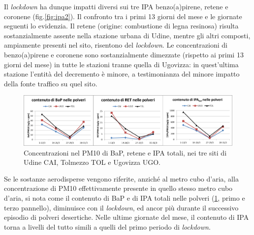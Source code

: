 Il \textit{lockdown} ha dunque impatti diversi sui tre IPA benzo(a)pirene, retene e coronene (fig.\ref{fig:ipa2}). Il confronto tra i primi 13 giorni del mese e le giornate seguenti lo evidenzia. Il retene (origine: combustione di legna resinosa) risulta sostanzialmente assente nella stazione urbana di Udine, mentre gli altri composti, ampiamente presenti nel sito, risentono del \textit{lockdown}. Le concentrazioni di benzo(a)pirene e coronene sono sostanzialmente dimezzate (rispetto ai primi 13 giorni del mese) in tutte le stazioni tranne quella di Ugovizza: in quest’ultima stazione l’entità del decremento è minore, a testimonianza del minore impatto della fonte traffico su quel sito.

\begin{figure}
    \centering
    \includegraphics[width=\textwidth]{figs/ipa-linee.png}
    \caption[Concentrazioni nel PM10 di BaP, retene e IPA totali]{Concentrazioni nel PM10 di BaP, retene e IPA totali, nei tre siti di Udine CAI, Tolmezzo TOL e Ugovizza UGO.}
    \label{fig:ipa3}
\end{figure}

Se le sostanze aerodisperse vengono riferite, anziché al metro cubo d’aria, alla concentrazione di PM10 effettivamente presente in quello stesso metro cubo d’aria, si nota come il contenuto di BaP e di IPA totali nelle polveri (\ref{fig:ipa3}, primo e terzo pannello), diminuisce con il \textit{lockdown}, ed ancor più durante il successivo episodio di polveri desertiche. Nelle ultime giornate del mese, il contenuto di IPA torna a livelli del tutto simili a quelli del primo periodo di \textit{lockdown}.

